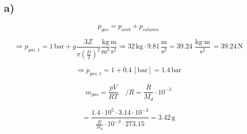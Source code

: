 

\subsection*{a)}

\[
p_{gas} = p_{amb} + p_{column}
\]

\[
\Rightarrow p_{gas,1} = 1 \, \text{bar} + g \frac{3Z}{\pi \left( \frac{D}{2} \right)^2} \frac{\text{kg}}{\text{m}^3} \frac{\text{m}}{\text{s}^2} \Rightarrow 32 \, \text{kg} \cdot 9.81 \, \frac{\text{m}}{\text{s}^2} = 39.24 \, \frac{\text{kg} \cdot \text{m}}{\text{s}^2} = 39.24 \, \text{N}
\]

\[
\Rightarrow p_{gas,1} = 1 + 0.4 \, [\text{bar}] = 1.4 \, \text{bar}
\]

\[
m_{gas} = \frac{pV}{RT} \quad /R = \frac{\overline{R}}{M_d} \cdot 10^{-3}
\]

\[
= \frac{1.4 \cdot 10^5 \cdot 3.14 \cdot 10^{-3}}{\frac{\overline{R}}{M_d} \cdot 10^{-3} \cdot 273.15} = 3.42 \, \text{g}
\]